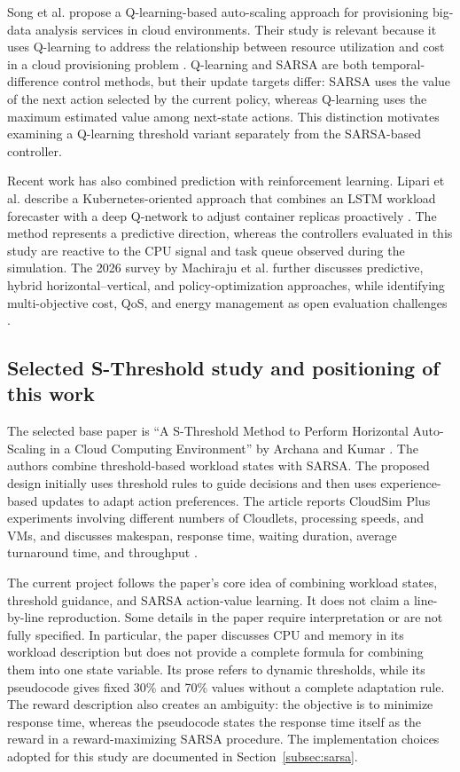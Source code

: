 \documentclass[pdflatex,sn-mathphys-num]{sn-jnl}
\begin{document}
Song et al. propose a Q-learning-based auto-scaling approach for provisioning big-data analysis services in cloud environments. Their study is relevant because it uses Q-learning to address the relationship between resource utilization and cost in a cloud provisioning problem \cite{song2024qlearning}. Q-learning and SARSA are both temporal-difference control methods, but their update targets differ: SARSA uses the value of the next action selected by the current policy, whereas Q-learning uses the maximum estimated value among next-state actions. This distinction motivates examining a Q-learning threshold variant separately from the SARSA-based controller.

Recent work has also combined prediction with reinforcement learning. Lipari et al. describe a Kubernetes-oriented approach that combines an LSTM workload forecaster with a deep Q-network to adjust container replicas proactively \cite{lipari2025forecast}. The method represents a predictive direction, whereas the controllers evaluated in this study are reactive to the CPU signal and task queue observed during the simulation. The 2026 survey by Machiraju et al. further discusses predictive, hybrid horizontal--vertical, and policy-optimization approaches, while identifying multi-objective cost, QoS, and energy management as open evaluation challenges \cite{machiraju2026survey}.

\subsection{Selected S-Threshold study and positioning of this work}

The selected base paper is ``A S-Threshold Method to Perform Horizontal Auto-Scaling in a Cloud Computing Environment'' by Archana and Kumar \cite{archana2025sthreshold}. The authors combine threshold-based workload states with SARSA. The proposed design initially uses threshold rules to guide decisions and then uses experience-based updates to adapt action preferences. The article reports CloudSim Plus experiments involving different numbers of Cloudlets, processing speeds, and VMs, and discusses makespan, response time, waiting duration, average turnaround time, and throughput \cite{archana2025sthreshold}.

The current project follows the paper's core idea of combining workload states, threshold guidance, and SARSA action-value learning. It does not claim a line-by-line reproduction. Some details in the paper require interpretation or are not fully specified. In particular, the paper discusses CPU and memory in its workload description but does not provide a complete formula for combining them into one state variable. Its prose refers to dynamic thresholds, while its pseudocode gives fixed 30\% and 70\% values without a complete adaptation rule. The reward description also creates an ambiguity: the objective is to minimize response time, whereas the pseudocode states the response time itself as the reward in a reward-maximizing SARSA procedure. The implementation choices adopted for this study are documented in Section~\ref{subsec:sarsa}.
\end{document}
